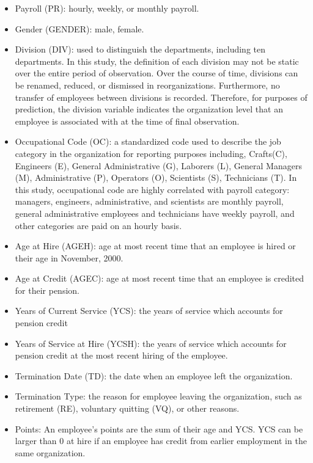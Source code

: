 \documentclass[12pt,letterpaper]{article}
\begin{document}
\begin{itemize}
	\item Payroll (PR): hourly, weekly, or monthly payroll.
	\item Gender (GENDER): male, female.
	\item Division (DIV): used to distinguish the departments, including ten departments. In this study, the definition of each division may not be static over the entire period of observation. Over the course of time, divisions can be renamed, reduced, or dismissed in reorganizations. Furthermore, no transfer of employees between divisions is recorded.  Therefore, for purposes of prediction, the division variable indicates the organization level that an employee is associated with at the time of final observation.
	\item Occupational Code (OC): a standardized code used to describe the job category in the organization for reporting purposes including, Crafts(C), Engineers (E), General Administrative (G), Laborers (L), General Managers (M),  Administrative (P),  Operators (O), Scientists (S), Technicians (T). In this study, occupational code are highly correlated with payroll category: managers, engineers, administrative, and scientists are monthly payroll, general administrative employees and technicians have weekly payroll, and other categories are paid on an hourly basis.
	\item Age at Hire (AGEH): age at most recent time that an employee is hired or their age in November, 2000.
	\item Age at Credit (AGEC): age at most recent time that an employee is credited for their pension.
	\item Years of Current Service (YCS): the years of service which accounts for pension credit
	\item Years of Service at Hire (YCSH): the years of service which accounts for pension credit at the most recent hiring of the employee.
	\item Termination Date (TD): the date when an employee left the organization.
	\item Termination Type: the reason for employee leaving the organization, such as retirement (RE),  voluntary quitting (VQ), or other reasons.
	\item Points: An employee's points are the sum of their age and YCS.  YCS can be larger than 0 at hire if an employee has credit from earlier employment in the same organization.
\end{itemize}
\end{document}
